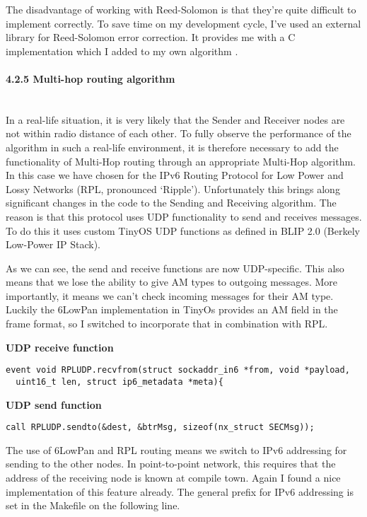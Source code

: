 The disadvantage of working with Reed-Solomon is that they're quite
difficult to implement correctly. To save time on my development cycle,
I've used an external library for Reed-Solomon error correction. It
provides me with a C implementation which I added to my own algorithm
\cite{hobbs}.

\paragraph{4.2.5 Multi-hop routing
algorithm\\\\}\label{multi-hop-routing-algorithm}

In a real-life situation, it is very likely that the Sender and Receiver
nodes are not within radio distance of each other. To fully observe the
performance of the algorithm in such a real-life environment, it is
therefore necessary to add the functionality of Multi-Hop routing
through an appropriate Multi-Hop algorithm. In this case we have chosen
for the IPv6 Routing Protocol for Low Power and Lossy Networks (RPL,
pronounced `Ripple'). Unfortunately this brings along significant
changes in the code to the Sending and Receiving algorithm. The reason
is that this protocol uses UDP functionality to send and receives
messages. To do this it uses custom TinyOS UDP functions as defined in
BLIP 2.0 (Berkely Low-Power IP Stack).

As we can see, the send and receive functions are now UDP-specific. This
also means that we lose the ability to give AM types to outgoing
messages. More importantly, it means we can't check incoming messages
for their AM type. Luckily the 6LowPan implementation in TinyOs provides
an AM field in the frame format, so I switched to incorporate that in
combination with RPL\cite{huitep}.

\textbf{UDP receive function}

\begin{verbatim}
event void RPLUDP.recvfrom(struct sockaddr_in6 *from, void *payload,
  uint16_t len, struct ip6_metadata *meta){
\end{verbatim}

\textbf{UDP send function}

\begin{verbatim}
call RPLUDP.sendto(&dest, &btrMsg, sizeof(nx_struct SECMsg));
\end{verbatim}

The use of 6LowPan and RPL routing means we switch to IPv6 addressing
for sending to the other nodes. In point-to-point network, this requires
that the address of the receiving node is known at compile town. Again I
found a nice implementation of this feature already. The general prefix
for IPv6 addressing is set in the Makefile on the following line.

